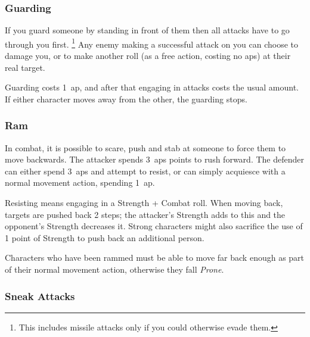 \begin{multicols}{2}
\subsubsection[Guard: Someone must successfully hit you before they are allowed to hit whomever you are guarding. Cost: 1 \gls{ap}]{Guarding}

If you guard someone by standing in front of them then all attacks have to go through you first.%
\footnote{This includes missile attacks only if you could otherwise evade them.}
Any enemy making a successful attack on you can choose to damage you, or to make another roll (as a free action, costing no \glspl{ap}) at their real target.

Guarding costs 1~\gls{ap}, and after that engaging in attacks costs the usual amount.
If either character moves away from the other, the guarding stops.

\subsubsection[Ram: Push the enemy back 2 steps plus the difference between your Strength Bonuses. Resisting costs 2 \glspl{ap}, and requires a resisted Strength + Combat roll. Cost: 3 \glspl{ap}]{Ram}
\label{ram}

In combat, it is possible to scare, push and stab at someone to force them to move backwards.
The attacker spends 3~\glspl{ap} points to rush forward.
The defender can either spend 3~\glspl{ap} and attempt to resist, or can simply acquiesce with a normal movement action, spending 1~\gls{ap}.

Resisting means engaging in a Strength + Combat roll.
When moving back, targets are pushed back 2 steps; the attacker's Strength adds to this and the opponent's Strength decreases it.
Strong characters might also sacrifice the use of 1 point of Strength to push back an additional person.

Characters who have been rammed must be able to move far back enough as part of their normal movement action, otherwise they fall \textit{Prone}.

\subsubsection[Sneak Attack: Dexterity + Stealth vs Wits + Vigilance; automatic \glsentrytext{vitalShot} with +2 Damage.]{Sneak Attacks}
\label{sneakattack}


\end{multicols}
